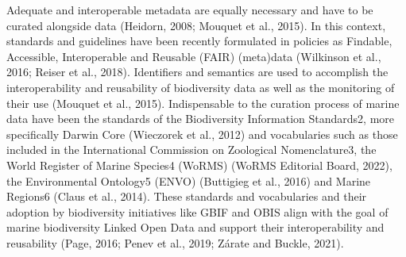 Adequate and interoperable metadata are equally necessary and have to be curated alongside data (Heidorn, 2008; Mouquet et al., 2015). In this context, standards and guidelines have been recently formulated in policies as Findable, Accessible, Interoperable and Reusable (FAIR) (meta)data (Wilkinson et al., 2016; Reiser et al., 2018). Identifiers and semantics are used to accomplish the interoperability and reusability of biodiversity data as well as the monitoring of their use (Mouquet et al., 2015). Indispensable to the curation process of marine data have been the standards of the Biodiversity Information Standards2, more specifically Darwin Core (Wieczorek et al., 2012) and vocabularies such as those included in the International Commission on Zoological Nomenclature3, the World Register of Marine Species4 (WoRMS) (WoRMS Editorial Board, 2022), the Environmental Ontology5 (ENVO) (Buttigieg et al., 2016) and Marine Regions6 (Claus et al., 2014). These standards and vocabularies and their adoption by biodiversity initiatives like GBIF and OBIS align with the goal of marine biodiversity Linked Open Data and support their interoperability and reusability (Page, 2016; Penev et al., 2019; Zárate and Buckle, 2021).

